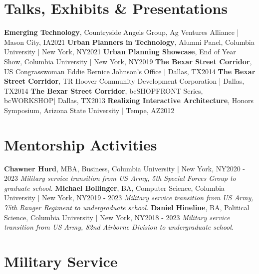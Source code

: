 \documentclass{article}
\begin{document}
    \section*{Talks, Exhibits \& Presentations}
        \textbf{Emerging Technology}, Countryside Angels Group, Ag Ventures Alliance | Mason City, IA\hfill{2021}\newline
        \textbf{Urban Planners in Technology}, Alumni Panel, Columbia University | New York, NY\hfill{2021}\newline
        \textbf{Urban Planning Showcase}, End of Year Show, Columbia University | New York, NY\hfill{2019}\newline
        \textbf{The Bexar Street Corridor}, US Congrasswoman Eddie Bernice Johnson's Office | Dallas, TX\hfill{2014}\newline
        \textbf{The Bexar Street Corridor}, TR Hoover Community Development Corporation | Dallas, TX\hfill{2014}\newline
        \textbf{The Bexar Street Corridor}, bcSHOPFRONT Series, bcWORKSHOP| Dallas, TX\hfill{2013}\newline
        \textbf{Realizing Interactive Architecture}, Honors Symposium, Arizona State University | Tempe, AZ\hfill{2012}
    \section*{Mentorship Activities}
        \textbf{Chawner Hurd}, MBA, Business, Columbia University | New York, NY\hfill{2020 - 2023}\newline
        \textit{Military service transition from US Army, 5th Special Forces Group to graduate school.}\newline\newline
        \textbf{Michael Bollinger}, BA, Computer Science, Columbia University | New York, NY\hfill{2019 - 2023}\newline
        \textit{Military service transition from US Army, 75th Ranger Regiment to undergraduate school.}\newline\newline
        \textbf{Daniel Hineline}, BA, Political Science, Columbia University | New York, NY\hfill{2018 - 2023}\newline
        \textit{Military service transition from US Army, 82nd Airborne Division to undergraduate school.}
    \section*{Military Service}
\end{document}
